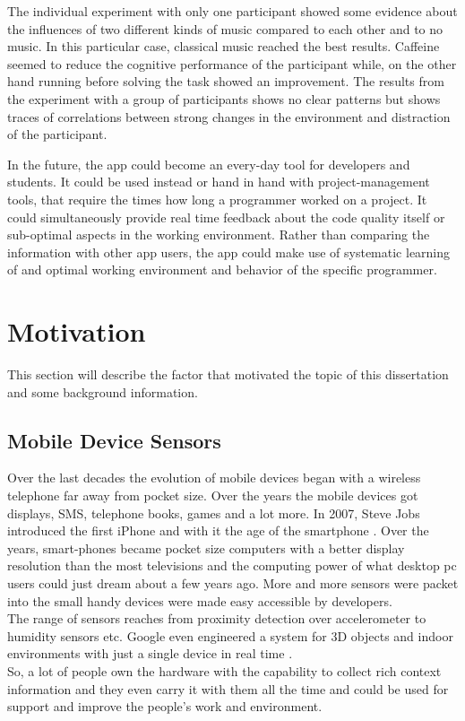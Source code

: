 The individual experiment with only one participant showed some evidence about the influences of two different kinds of music compared to each other and to no music. In this particular case, classical music reached the best results. Caffeine seemed to reduce the cognitive performance of the participant while, on the other hand running before solving the task showed an improvement.
The results from the experiment with a group of participants shows no clear patterns but shows traces of correlations between strong changes in the environment and distraction of the participant.  

\bigbreak
In the future, the app could become an every-day tool for developers and students. It could be used instead or hand in hand with project-management tools, that require the times how long a programmer worked on a project. It could simultaneously provide real time feedback about the code quality itself or sub-optimal aspects in the working environment. Rather than comparing the information with other app users, the app could make use of systematic learning of and optimal working environment and behavior of the specific programmer.

\section{Motivation}
This section will describe the factor that motivated the topic of this dissertation and some background information. 

\subsection{Mobile Device Sensors}
Over the last decades the evolution of mobile devices began with a wireless telephone far away from pocket size. Over the years the mobile devices got displays, SMS, telephone books, games and a lot more. In 2007, Steve Jobs introduced the first iPhone and with it the age of the smartphone  \cite{laugesen2010factors}. Over the years, smart-phones became pocket size computers with a better display resolution than the most televisions and the computing power of what desktop pc users could just dream about a few years ago. More and more sensors were packet into the small handy devices were made easy accessible by developers.\\
The range of sensors reaches from proximity detection over accelerometer to humidity sensors etc. Google even engineered a system for 3D objects and indoor environments with just a single device in real time \cite{schops20153d}.\\
So, a lot of people own the hardware with the capability to collect rich context information and they even carry it with them all the time and could be used for support and improve the people's work and environment.

